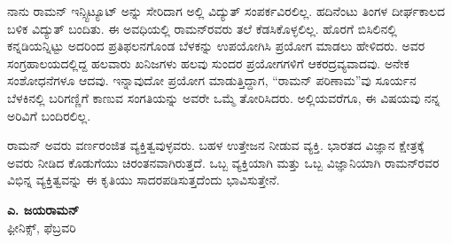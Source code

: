 ನಾನು ರಾಮನ್ ಇನ್ಸ್ಟಿಟ್ಯೂಟ್ ಅನ್ನು ಸೇರಿದಾಗ ಅಲ್ಲಿ ವಿದ್ಯುತ್ ಸಂಪರ್ಕವಿರಲಿಲ್ಲ. ಹದಿನೆಂಟು ತಿಂಗಳ ದೀರ್ಘಕಾಲದ ಬಳಿಕ ವಿದ್ಯುತ್ ಬಂದಿತು. ಈ ಅವಧಿಯಲ್ಲಿ ರಾಮನ್‍ರವರು ತಲೆ ಕೆಡಸಿಕೊಳ್ಳಲಿಲ್ಲ. ಹೊರಗೆ ಬಿಸಿಲಿನಲ್ಲಿ ಕನ್ನಡಿಯನ್ನಿಟ್ಟು ಅದರಿಂದ ಪ್ರತಿಫಲನಗೊಂಡ ಬೆಳಕನ್ನು ಉಪಯೋಗಿಸಿ ಪ್ರಯೋಗ ಮಾಡಲು ಹೇಳಿದರು. ಅವರ ಸಂಗ್ರಹಾಲಯದಲ್ಲಿದ್ದ ಹಲವಾರು ಖನಿಜಗಳು ಹಲವು ಸುಂದರ ಪ್ರಯೋಗಗಳಿಗೆ ಆಕರದ್ರವ್ಯವಾದವು. ಅನೇಕ ಸಂಶೋಧನೆಗಳೂ ಆದವು. ಇನ್ನಾವುದೋ ಪ್ರಯೋಗ ಮಾಡುತ್ತಿದ್ದಾಗ, “ರಾಮನ್ ಪರಿಣಾಮ”ವು ಸೂರ್ಯನ ಬೆಳಕಿನಲ್ಲಿ ಬರಿಗಣ್ಣಿಗೆ ಕಾಣುವ ಸಂಗತಿಯನ್ನು ಅವರೇ ಒಮ್ಮೆ ತೋರಿಸಿದರು. ಅಲ್ಲಿಯವರೆಗೂ, ಈ ವಿಷಯವು ನನ್ನ ಅರಿವಿಗೆ ಬಂದಿರಲಿಲ್ಲ.

ರಾಮನ್ ಅವರು ವರ್ಣರಂಜಿತ ವ್ಯಕ್ತಿತ್ವವುಳ್ಳವರು. ಬಹಳ ಉತ್ತೇಜನ ನೀಡುವ ವ್ಯಕ್ತಿ. ಭಾರತದ ವಿಜ್ಞಾನ ಕ್ಷೇತ್ರಕ್ಕೆ ಅವರು ನೀಡಿದ ಕೊಡುಗೆಯು ಚಿರಂತನವಾಗಿರುತ್ತದೆ. ಒಬ್ಬ ವ್ಯಕ್ತಿಯಾಗಿ ಮತ್ತು ಒಬ್ಬ ವಿಜ್ಞಾನಿಯಾಗಿ ರಾಮನ್‍ರವರ ವಿಭಿನ್ನ ವ್ಯಕ್ತಿತ್ವವನ್ನು ಈ ಕೃತಿಯು ಸಾದರಪಡಿಸುತ್ತದೆಂದು ಭಾವಿಸುತ್ತೇನೆ.

\begin{flushright}
\textbf{ಎ. ಜಯರಾಮನ್}\\ಫಿ಼ೕನಿಕ್ಸ್, ಫೆಬ್ರವರಿ 
\end{flushright}

